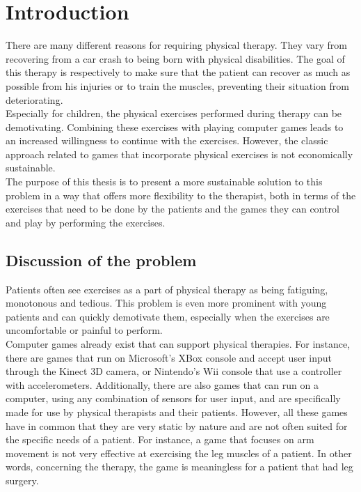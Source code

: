 \chapter{Introduction}

There are many different reasons for requiring physical therapy. They vary from recovering from a car crash to being born with physical disabilities. The goal of this therapy is respectively to make sure that the patient can recover as much as possible from his injuries or to train the muscles, preventing their situation from deteriorating.\\

Especially for children, the physical exercises performed during therapy can be demotivating. Combining these exercises with playing computer games leads to an increased willingness to continue with the exercises. However, the classic approach related to games that incorporate physical exercises is not economically sustainable.\\

The purpose of this thesis is to present a more sustainable solution to this problem in a way that offers more flexibility to the therapist, both in terms of the exercises that need to be done by the patients and the games they can control and play by performing the exercises.


\section{Discussion of the problem}

Patients often see exercises as a part of physical therapy as being fatiguing, monotonous and tedious. This problem is even more prominent with young patients and can quickly demotivate them, especially when the exercises are uncomfortable or painful to perform.\\ %

Computer games already exist that can support physical therapies. For instance, there are games that run on Microsoft's XBox console and accept user input through the Kinect 3D camera, or Nintendo's Wii console that use a controller with accelerometers. Additionally, there are also games that can run on a computer, using any combination of sensors for user input, and are specifically made for use by physical therapists and their patients. However, all these games have in common that they are very static by nature and are not often suited for the specific needs of a patient. For instance, a game that focuses on arm movement is not very effective at exercising the leg muscles of a patient. In other words, concerning the therapy, the game is meaningless for a patient that had leg surgery.\\

